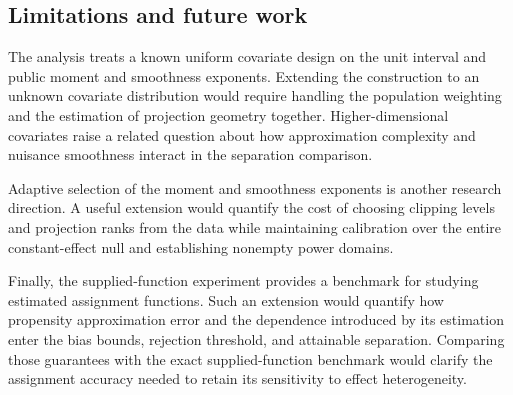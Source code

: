 \subsection{Limitations and future work}

The analysis treats a known uniform covariate design on the unit interval and public moment and smoothness exponents. Extending the construction to an unknown covariate distribution would require handling the population weighting and the estimation of projection geometry together. Higher-dimensional covariates raise a related question about how approximation complexity and nuisance smoothness interact in the separation comparison.

Adaptive selection of the moment and smoothness exponents is another research direction. A useful extension would quantify the cost of choosing clipping levels and projection ranks from the data while maintaining calibration over the entire constant-effect null and establishing nonempty power domains.

Finally, the supplied-function experiment provides a benchmark for studying estimated assignment functions. Such an extension would quantify how propensity approximation error and the dependence introduced by its estimation enter the bias bounds, rejection threshold, and attainable separation. Comparing those guarantees with the exact supplied-function benchmark would clarify the assignment accuracy needed to retain its sensitivity to effect heterogeneity.
